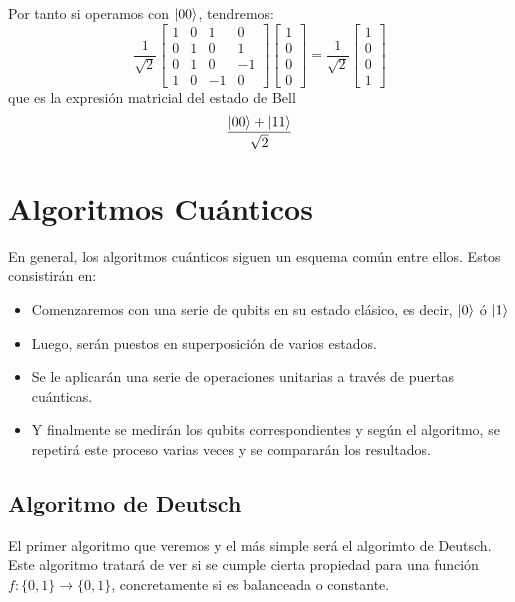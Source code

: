 \documentclass[a4paper]{article}
\numberwithin{equation}{section}
\begin{document}
Por tanto si operamos con $\ket{00}$, tendremos:
\begin{equation}
\frac{1}{\sqrt{2}}
\begin{bmatrix}
1 & 0 & 1 & 0 \\
0 & 1 & 0 & 1 \\
0 & 1 & 0 & -1 \\
1 & 0 & -1 & 0
\end{bmatrix}
\begin{bmatrix}
1 \\ 0 \\ 0 \\ 0
\end{bmatrix} = 
\frac{1}{\sqrt{2}}
\begin{bmatrix}
1 \\ 0 \\ 0 \\ 1
\end{bmatrix}
\end{equation}
que es la expresión matricial del estado de Bell
\begin{equation}
\frac{\ket{00} + \ket{11}}{\sqrt{2}}
\end{equation}
\newpage

\section{Algoritmos Cuánticos}

En general, los algoritmos cuánticos siguen un esquema común entre ellos. Estos consistirán en:
\begin{itemize}
\item Comenzaremos con una serie de qubits en su estado clásico, es decir, $\ket{0}$ ó $\ket{1}$
\item Luego, serán puestos en superposición de varios estados.
\item Se le aplicarán una serie de operaciones unitarias a través de puertas cuánticas.
\item Y finalmente se medirán los qubits correspondientes y según el algoritmo, se repetirá este proceso varias veces y se compararán los resultados.

\end{itemize}

\subsection{Algoritmo de Deutsch}

El primer algoritmo que veremos y el más simple será el algorimto de Deutsch. Este algoritmo tratará de ver si se cumple cierta propiedad para una función $f:\{0, 1\} \rightarrow \{0, 1\}$, concretamente si es balanceada o constante.
\end{document}
